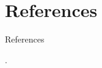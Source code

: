\documentclass[style=upen, size=14pt]{powerdot}
\theoremstyle{definition}
\begin{document}
\section{References}

\begin{slide}{References}
  
  \begin{footnotesize}

    .\medskip

  \end{footnotesize}
\end{slide}



    
\end{document}
